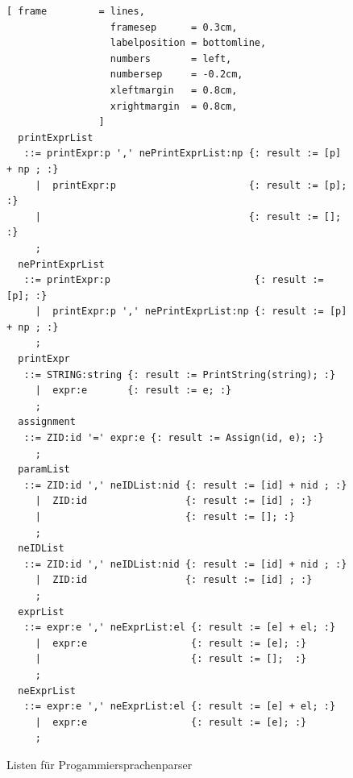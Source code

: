 \begin{figure}[!ht]

\begin{Verbatim}[ frame         = lines, 
                  framesep      = 0.3cm, 
                  labelposition = bottomline,
                  numbers       = left,
                  numbersep     = -0.2cm,
                  xleftmargin   = 0.8cm,
                  xrightmargin  = 0.8cm,
                ]
  printExprList 
   ::= printExpr:p ',' nePrintExprList:np {: result := [p] + np ; :}
     |  printExpr:p                       {: result := [p]; :}
     |                                    {: result := [];  :}
     ;
  nePrintExprList
   ::= printExpr:p                         {: result := [p]; :}
     |  printExpr:p ',' nePrintExprList:np {: result := [p] + np ; :}
     ;
  printExpr 
   ::= STRING:string {: result := PrintString(string); :}
     |  expr:e       {: result := e; :}
     ;
  assignment 
   ::= ZID:id '=' expr:e {: result := Assign(id, e); :}
     ;
  paramList 
   ::= ZID:id ',' neIDList:nid {: result := [id] + nid ; :}
     |  ZID:id                 {: result := [id] ; :}
     |                         {: result := []; :}
     ;
  neIDList
   ::= ZID:id ',' neIDList:nid {: result := [id] + nid ; :}
     |  ZID:id                 {: result := [id] ; :}
     ;
  exprList
   ::= expr:e ',' neExprList:el {: result := [e] + el; :}
     |  expr:e                  {: result := [e]; :}
     |                          {: result := [];  :}
     ;
  neExprList
   ::= expr:e ',' neExprList:el {: result := [e] + el; :}
     |  expr:e                  {: result := [e]; :}
     ;
		\end{Verbatim}
\caption{Listen für Progammiersprachenparser}
\label{fig:example_interpreter_grammar_lists}
\end{figure}
